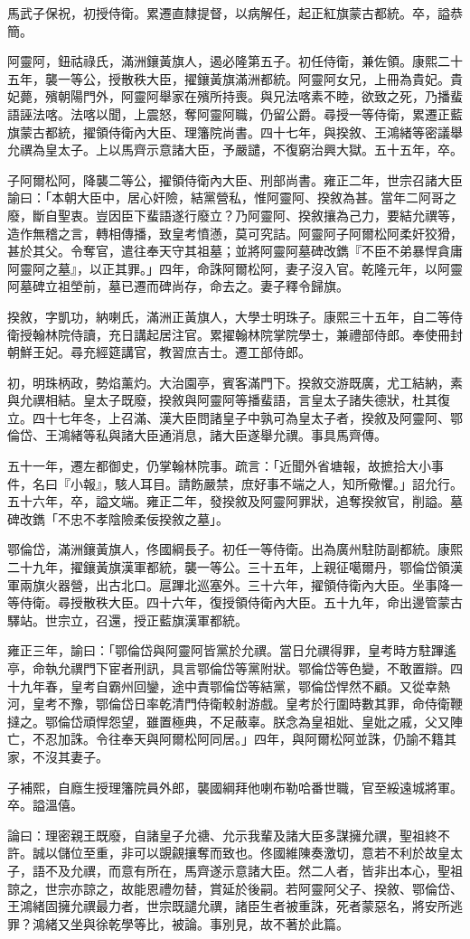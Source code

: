 \begin{pinyinscope}
馬武子保祝，初授侍衛。累遷直隸提督，以病解任，起正紅旗蒙古都統。卒，謚恭簡。

阿靈阿，鈕祜祿氏，滿洲鑲黃旗人，遏必隆第五子。初任侍衛，兼佐領。康熙二十五年，襲一等公，授散秩大臣，擢鑲黃旗滿洲都統。阿靈阿女兄，上冊為貴妃。貴妃薨，殯朝陽門外，阿靈阿舉家在殯所持喪。與兄法喀素不睦，欲致之死，乃播蜚語誣法喀。法喀以聞，上震怒，奪阿靈阿職，仍留公爵。尋授一等侍衛，累遷正藍旗蒙古都統，擢領侍衛內大臣、理籓院尚書。四十七年，與揆敘、王鴻緒等密議舉允禩為皇太子。上以馬齊示意諸大臣，予嚴譴，不復窮治興大獄。五十五年，卒。

子阿爾松阿，降襲二等公，擢領侍衛內大臣、刑部尚書。雍正二年，世宗召諸大臣諭曰：「本朝大臣中，居心奸險，結黨營私，惟阿靈阿、揆敘為甚。當年二阿哥之廢，斷自聖衷。豈因臣下蜚語遂行廢立？乃阿靈阿、揆敘攘為己力，要結允禩等，造作無稽之言，轉相傳播，致皇考憤懣，莫可究詰。阿靈阿子阿爾松阿柔奸狡猾，甚於其父。令奪官，遣往奉天守其祖墓；並將阿靈阿墓碑改鐫『不臣不弟暴悍貪庸阿靈阿之墓』，以正其罪。」四年，命誅阿爾松阿，妻子沒入官。乾隆元年，以阿靈阿墓碑立祖塋前，墓已遷而碑尚存，命去之。妻子釋令歸旗。

揆敘，字凱功，納喇氏，滿洲正黃旗人，大學士明珠子。康熙三十五年，自二等侍衛授翰林院侍讀，充日講起居注官。累擢翰林院掌院學士，兼禮部侍郎。奉使冊封朝鮮王妃。尋充經筵講官，教習庶吉士。遷工部侍郎。

初，明珠柄政，勢焰薰灼。大治園亭，賓客滿門下。揆敘交游既廣，尤工結納，素與允禩相結。皇太子既廢，揆敘與阿靈阿等播蜚語，言皇太子諸失德狀，杜其復立。四十七年冬，上召滿、漢大臣問諸皇子中孰可為皇太子者，揆敘及阿靈阿、鄂倫岱、王鴻緒等私與諸大臣通消息，諸大臣遂舉允禩。事具馬齊傳。

五十一年，遷左都御史，仍掌翰林院事。疏言：「近聞外省塘報，故摭拾大小事件，名曰『小報』，駭人耳目。請飭嚴禁，庶好事不端之人，知所儆懼。」詔允行。五十六年，卒，謚文端。雍正二年，發揆敘及阿靈阿罪狀，追奪揆敘官，削謚。墓碑改鐫「不忠不孝陰險柔佞揆敘之墓」。

鄂倫岱，滿洲鑲黃旗人，佟國綱長子。初任一等侍衛。出為廣州駐防副都統。康熙二十九年，擢鑲黃旗漢軍都統，襲一等公。三十五年，上親征噶爾丹，鄂倫岱領漢軍兩旗火器營，出古北口。扈蹕北巡塞外。三十六年，擢領侍衛內大臣。坐事降一等侍衛。尋授散秩大臣。四十六年，復授領侍衛內大臣。五十九年，命出邊管蒙古驛站。世宗立，召還，授正藍旗漢軍都統。

雍正三年，諭曰：「鄂倫岱與阿靈阿皆黨於允禩。當日允禩得罪，皇考時方駐蹕遙亭，命執允禩門下宦者刑訊，具言鄂倫岱等黨附狀。鄂倫岱等色變，不敢置辯。四十九年春，皇考自霸州回鑾，途中責鄂倫岱等結黨，鄂倫岱悍然不顧。又從幸熱河，皇考不豫，鄂倫岱日率乾清門侍衛較射游戲。皇考於行圍時數其罪，命侍衛鞭撻之。鄂倫岱頑悍怨望，雖置極典，不足蔽辜。朕念為皇祖妣、皇妣之戚，父又陣亡，不忍加誅。令往奉天與阿爾松阿同居。」四年，與阿爾松阿並誅，仍諭不籍其家，不沒其妻子。

子補熙，自廕生授理籓院員外郎，襲國綱拜他喇布勒哈番世職，官至綏遠城將軍。卒。謚溫僖。

論曰：理密親王既廢，自諸皇子允禟、允示我輩及諸大臣多謀擁允禩，聖祖終不許。誠以儲位至重，非可以覬覦攘奪而致也。佟國維陳奏激切，意若不利於故皇太子，語不及允禩，而意有所在，馬齊遂示意諸大臣。然二人者，皆非出本心，聖祖諒之，世宗亦諒之，故能恩禮勿替，賞延於後嗣。若阿靈阿父子、揆敘、鄂倫岱、王鴻緒固擁允禩最力者，世宗既譴允禩，諸臣生者被重誅，死者蒙惡名，將安所逃罪？鴻緒又坐與徐乾學等比，被論。事別見，故不著於此篇。


\end{pinyinscope}